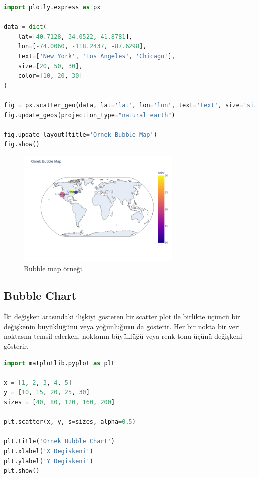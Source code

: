 \begin{lstlisting}[language=Python]
import plotly.express as px

data = dict(
    lat=[40.7128, 34.0522, 41.8781],
    lon=[-74.0060, -118.2437, -87.6298],
    text=['New York', 'Los Angeles', 'Chicago'],
    size=[20, 50, 30],
    color=[10, 20, 30]
)

fig = px.scatter_geo(data, lat='lat', lon='lon', text='text', size='size', color='color')
fig.update_geos(projection_type="natural earth")

fig.update_layout(title='Ornek Bubble Map')
fig.show()
\end{lstlisting}

\begin{figure}[h]
    \centering
    \includegraphics[width=0.7\textwidth]{images/bubble_map.png}
    \caption{Bubble map örneği.}
    \label{fig:enter-label}
\end{figure}

\newpage

\subsection{Bubble Chart}
İki değişken arasındaki ilişkiyi gösteren bir scatter plot ile birlikte üçüncü bir değişkenin büyüklüğünü veya yoğunluğunu da gösterir. Her bir nokta bir veri noktasını temsil ederken, noktanın büyüklüğü veya renk tonu üçünü değişkeni gösterir.

\begin{lstlisting}[language=Python]
import matplotlib.pyplot as plt

x = [1, 2, 3, 4, 5]
y = [10, 15, 20, 25, 30]
sizes = [40, 80, 120, 160, 200]

plt.scatter(x, y, s=sizes, alpha=0.5)

plt.title('Ornek Bubble Chart')
plt.xlabel('X Degiskeni')
plt.ylabel('Y Degiskeni')
plt.show()
\end{lstlisting}

